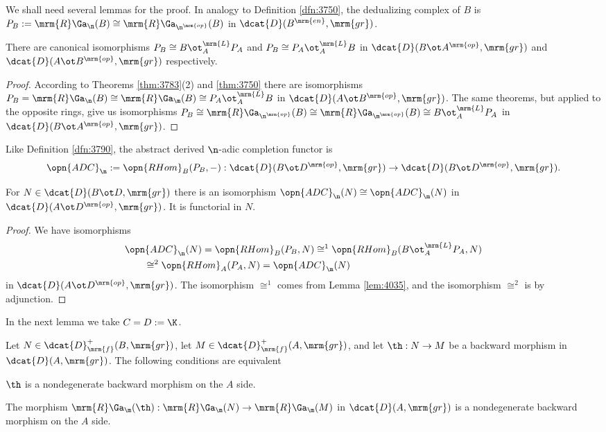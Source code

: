 We shall need several lemmas for the proof. In analogy to Definition 
\ref{dfn:3750}, the dedualizing complex of $B$ is 
$P_B := \mrm{R} \Ga_{\n}(B) \cong \mrm{R} \Ga_{\n^{\mrm{op}}}(B)$ 
in $\dcat{D}(B^{\mrm{en}}, \mrm{gr})$.

\begin{lem} \label{lem:4035}
There are canonical isomorphisms 
$P_B \cong B \ot^{\mrm{L}}_{A} P_A$ and
$P_B \cong P_A \ot^{\mrm{L}}_{A} B$
in $\dcat{D}(B \ot A^{\mrm{op}}, \mrm{gr})$ and 
$\dcat{D}(A \ot B^{\mrm{op}}, \mrm{gr})$ respectively.
\end{lem}

\begin{proof}
According to Theorems \ref{thm:3783}(2) and \ref{thm:3750} there are 
isomorphisms
$P_B = \mrm{R} \Ga_{\n}(B) \cong \mrm{R} \Ga_{\m}(B) \cong 
P_A \ot^{\mrm{L}}_{A} B$
in $\dcat{D}(A \ot B^{\mrm{op}}, \mrm{gr})$. The same theorems, but applied to 
the opposite rings, give us isomorphisms
$P_B \cong \mrm{R} \Ga_{\n^{\mrm{op}}}(B) \cong 
\mrm{R} \Ga_{\m^{\mrm{op}}}(B) \cong B \ot^{\mrm{L}}_{A} P_A$
in $\dcat{D}(B \ot A^{\mrm{op}}, \mrm{gr})$.
\end{proof}

Like Definition \ref{dfn:3790}, the abstract derived $\n$-adic completion 
functor is 
\[ \opn{ADC}_{\n} := \opn{RHom}_{B}(P_B, -) : 
\dcat{D}(B \ot D^{\mrm{op}}, \mrm{gr}) \to 
\dcat{D}(B \ot D^{\mrm{op}}, \mrm{gr}) . \]

\begin{lem} \label{lem:4036}
For $N \in \dcat{D}(B \ot D, \mrm{gr})$
there is an isomorphism 
$\opn{ADC}_{\n}(N) \cong \opn{ADC}_{\m}(N)$
in $\dcat{D}(A \ot D^{\mrm{op}}, \mrm{gr})$.
It is functorial in $N$. 
\end{lem}

\begin{proof}
We have isomorphisms 
\[ \begin{aligned}
& \opn{ADC}_{\n}(N) = \opn{RHom}_{B}(P_B, N) \cong^1 
\opn{RHom}_{B}(B \ot^{\mrm{L}}_{A} P_A, N) 
\\
& \qquad 
\cong^2 \opn{RHom}_{A}(P_A, N) = \opn{ADC}_{\m}(N)
\end{aligned} \]
in $\dcat{D}(A \ot D^{\mrm{op}}, \mrm{gr})$. 
The isomorphism $\cong^1$ comes from Lemma \ref{lem:4035}, and the 
isomorphism $\cong^2$ is by adjunction. 
\end{proof}

In the next lemma we take $C = D := \K$. 

\begin{lem} \label{lem:4065}
Let $N \in \dcat{D}^{+}_{\mrm{f}}(B, \mrm{gr})$,
let $M \in \dcat{D}^{+}_{\mrm{f}}(A, \mrm{gr})$,
and let 
$\th : N \to M$ be a backward morphism in 
$\dcat{D}(A, \mrm{gr})$. The following conditions are 
equivalent\tup{:}
\begin{enumerate}
 $\th$ is a nondegenerate backward morphism on the $A$ side.  

 The morphism 
$\mrm{R} \Ga_{\m}(\th) : \mrm{R} \Ga_{\m}(N) \to \mrm{R} \Ga_{\m}(M)$
in $\dcat{D}(A, \mrm{gr})$ is a nondegenerate backward morphism on the $A$ 
side. 
\end{enumerate}
\end{lem}

